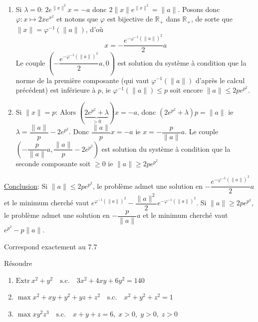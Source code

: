 \documentclass{fancybook}
\begin{document}
\begin{enumerate}
\item Si $\lambda=0$: \newline
$2e^{\|x\|^2}x = -a $ donc $2\|x\|e^{\|x\|^2}=\|a\|$. Posons donc $\varphi:x\mapsto 2xe^{x^2}$ et notons que $\varphi$ est bijective de $\mathbb R_+$ dans $\mathbb R_+$, de sorte que $\|x\|=\varphi^{-1}(\|a\|)$, d'où $$x=-\dfrac{e^{-\varphi^{-1}(\|a\|)^2}}{2}a$$
Le couple $(-\dfrac{e^{-\varphi^{-1}(\|a\|)^2}}{2}a,0)$ est solution du système à condition que la norme de la première composante (qui vaut $\varphi^{-1}(\|a\|)$ d'après le calcul précédent) est inférieure à $p$, ie $\varphi^{-1}(\|a\|) \leq p$ soit encore $\|a\| \leq 2pe^{p^2}$.
\item Si $\|x\|=p$: \newline
Alors $(\underbrace{2e^{p^2}+\lambda}_{>0})x=-a$, donc $(2e^{p^2}+\lambda)p = \|a\|$ ie $\lambda = \dfrac{\|a\|}p-2e^{p^2}$. \newline
Donc $\dfrac{\|a\|}{p}x=-a$ ie $x=-\dfrac{p}{\|a\|}a$. Le couple $(-\dfrac{p}{\|a\|}a,\dfrac{\|a\|}p-2e^{p^2})$ est solution du système à condition que la seconde composante soit $\geq 0$ ie $\|a\| \geq 2pe^{p^2}$
\end{enumerate}
\underline{Conclusion}: Si $\|a\| \leq 2pe^{p^2}$, le problème admet une solution en $-\dfrac{e^{-\varphi^{-1}(\|a\|)^2}}{2}a$ et le minimum cherché vaut $e^{\varphi^{-1}(\|a\|)^2}-\dfrac{\|a\|^2}{2}e^{-\varphi^{-1}(\|a\|)^2}$. \newline
Si $\|a\| \geq 2pe^{p^2}$, le problème admet une solution en $-\dfrac{p}{\|a\|}a$ et le minimum cherché vaut $e^{p^2}-p\|a\|$.


\begin{exercice}

\end{exercice}
Correspond exactement au 7.7



\begin{exercice}
Résoudre
\begin{enumerate}
\item $\text{Extr}\ x^2+y^2 \quad \text{s.c.} \quad 3x^2 + 4xy + 6y^2 = 140 $
\item $\max x^2 + xy + y^2 + yz + z^2 \quad \text{s.c.} \quad x^2+y^2+z^2 = 1 $ 
\item $\max xy^2z^3 \quad \text{s.c.} \quad x+y+z = 6,\; x>0,\;y>0,\;z>0$
\end{enumerate}
\end{exercice}
\end{document}
